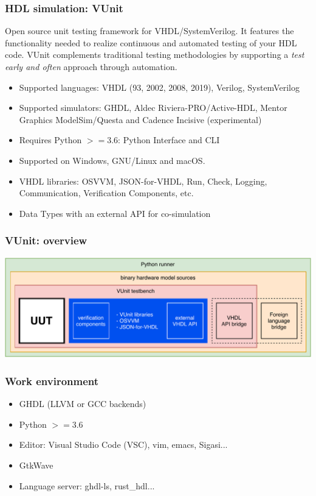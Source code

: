 \documentclass{beamer}
\begin{document}
\begin{frame}
\frametitle{HDL simulation: VUnit}
\small
Open source unit testing framework for VHDL/SystemVerilog. It features the functionality needed to realize continuous and automated testing of your HDL code. VUnit complements traditional testing methodologies by supporting a \emph{test early and often} approach through automation.
\vspace{1em}
\begin{itemize}
  \item Supported languages: VHDL (93, 2002, 2008, 2019), Verilog, SystemVerilog
  \item Supported simulators: GHDL, Aldec Riviera-PRO/Active-HDL, Mentor Graphics ModelSim/Questa and Cadence Incisive (experimental)
  \item Requires Python $>=3.6$: Python Interface and CLI
  \item Supported on Windows, GNU/Linux and macOS.
  \item VHDL libraries: OSVVM, JSON-for-VHDL, Run, Check, Logging, Communication, Verification Components, etc.
  \item Data Types with an external API for co-simulation
\end{itemize}
\end{frame}

\begin{frame}
\frametitle{VUnit: overview}
\centering
\includegraphics[width=\linewidth]{vunit_cosim.pdf}
\end{frame}

\begin{frame}
\frametitle{Work environment}
\begin{itemize}
  \item GHDL (LLVM or GCC backends)
  \vspace{1em}

  \item Python $>=3.6$
  \vspace{1em}

  \item Editor: Visual Studio Code (VSC), vim, emacs, Sigasi...
  \vspace{1em}

  \item GtkWave
  \vspace{1em}

  \item Language server: ghdl-ls, rust\_hdl...
\end{itemize}
\end{frame}
\end{document}
